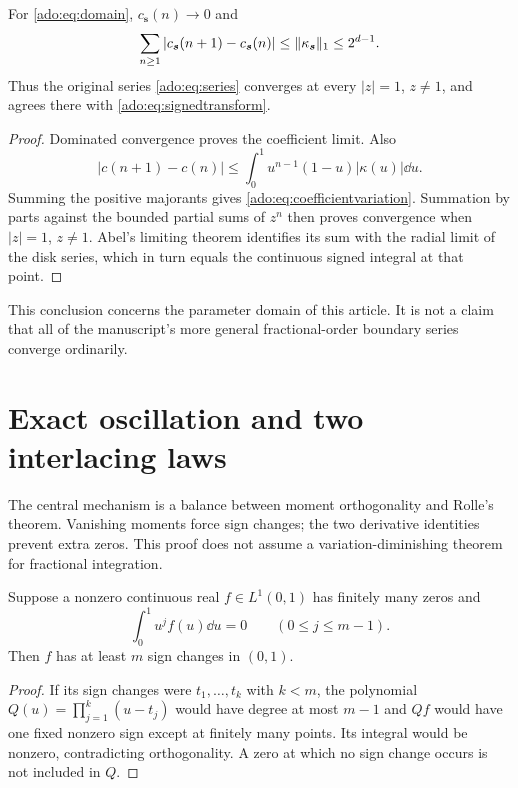 \begin{corollary}
\label{ado:cor:boundaryseries}
For \eqref{ado:eq:domain}, $c_{\boldsymbol{s}}(n)\to0$ and
\begin{equation}\label{ado:eq:coefficientvariation}
 \sum_{n\ge1}|c_{\boldsymbol{s}}(n+1)-c_{\boldsymbol{s}}(n)|
 \le\lVert\kappa_{\boldsymbol{s}}\rVert_1\le2^{d-1}.
\end{equation}
Thus the original series \eqref{ado:eq:series} converges at every
$|z|=1$, $z\ne1$, and agrees there with \eqref{ado:eq:signedtransform}.
\end{corollary}
\begin{proof}
Dominated convergence proves the coefficient limit. Also
\[
 |c(n+1)-c(n)|\le\int_0^1u^{n-1}(1-u)|\kappa(u)|\dd u.
\]
Summing the positive majorants gives \eqref{ado:eq:coefficientvariation}.
Summation by parts against the bounded partial sums of $z^n$ then proves
convergence when $|z|=1$, $z\ne1$. Abel's limiting theorem identifies its
sum with the radial limit of the disk series, which in turn equals the
continuous signed integral at that point.
\end{proof}
This conclusion concerns the parameter domain of this article. It is not
a claim that all of the manuscript's more general fractional-order
boundary series converge ordinarily.

\section{Exact oscillation and two interlacing laws}
\label{ado:sec:oscillation}
The central mechanism is a balance between moment orthogonality and
Rolle's theorem. Vanishing moments force sign changes; the two derivative
identities prevent extra zeros. This proof does not assume a
variation-diminishing theorem for fractional integration.

\begin{lemma}
\label{ado:lem:momentchanges}
Suppose a nonzero continuous real $f\in L^1(0,1)$ has finitely many
zeros and
\[
 \int_0^1u^j f(u)\dd u=0\qquad(0\le j\le m-1).
\]
Then $f$ has at least $m$ sign changes in $(0,1)$.
\end{lemma}
\begin{proof}
If its sign changes were $t_1,\ldots,t_k$ with $k<m$, the polynomial
$Q(u)=\prod_{j=1}^k(u-t_j)$ would have degree at most $m-1$ and
$Qf$ would have one fixed nonzero sign except at finitely many points.
Its integral would be nonzero, contradicting orthogonality. A zero at
which no sign change occurs is not included in $Q$.
\end{proof}

